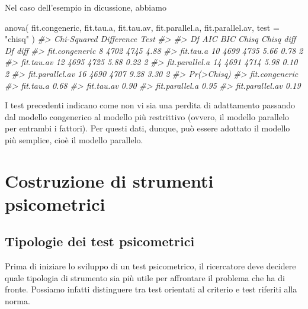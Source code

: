 \documentclass[
  11pt,
]{krantz}
\makeatletter
\newenvironment{Shaded}{\begin{snugshade}}{\end{snugshade}}
\newcommand{\AttributeTok}[1]{\textcolor[rgb]{0.61,0.61,0.61}{#1}}
\newcommand{\CommentTok}[1]{\textcolor[rgb]{0.37,0.37,0.37}{\textit{#1}}}
\newcommand{\FunctionTok}[1]{\textcolor[rgb]{0,0,0}{#1}}
\newcommand{\NormalTok}[1]{#1}
\newcommand{\StringTok}[1]{\textcolor[rgb]{0.5,0.5,0.5}{#1}}
\newenvironment{kframe}{%
\medskip{}
\setlength{\fboxsep}{.8em}
 \def\at@end@of@kframe{}%
 \ifinner\ifhmode%
  \def\at@end@of@kframe{\end{minipage}}%
  \begin{minipage}{\columnwidth}%
 \fi\fi%
 \def\FrameCommand##1{\hskip\@totalleftmargin \hskip-\fboxsep
 \colorbox{shadecolor}{##1}\hskip-\fboxsep
     \hskip-\linewidth \hskip-\@totalleftmargin \hskip\columnwidth}%
 \MakeFramed {\advance\hsize-\width
   \@totalleftmargin\z@ \linewidth\hsize
   \@setminipage}}%
 {\par\unskip\endMakeFramed%
 \at@end@of@kframe}
\renewenvironment{Shaded}{\begin{kframe}}{\end{kframe}}
\theoremstyle{definition}
\theoremstyle{definition}
\theoremstyle{definition}
\theoremstyle{definition}
\theoremstyle{remark}
\makeatother
\begin{document}
Nel caso dell'esempio in dicussione, abbiamo

\begin{Shaded}
\begin{Highlighting}[]
\FunctionTok{anova}\NormalTok{(}
\NormalTok{  fit.congeneric,}
\NormalTok{  fit.tau.a,}
\NormalTok{  fit.tau.av,}
\NormalTok{  fit.parallel.a,}
\NormalTok{  fit.parallel.av,}
  \AttributeTok{test =} \StringTok{"chisq"}
\NormalTok{)}
\CommentTok{\#\textgreater{} Chi{-}Squared Difference Test}
\CommentTok{\#\textgreater{} }
\CommentTok{\#\textgreater{}                 Df  AIC  BIC Chisq Chisq diff Df diff}
\CommentTok{\#\textgreater{} fit.congeneric   8 4702 4745  4.88                   }
\CommentTok{\#\textgreater{} fit.tau.a       10 4699 4735  5.66       0.78       2}
\CommentTok{\#\textgreater{} fit.tau.av      12 4695 4725  5.88       0.22       2}
\CommentTok{\#\textgreater{} fit.parallel.a  14 4691 4714  5.98       0.10       2}
\CommentTok{\#\textgreater{} fit.parallel.av 16 4690 4707  9.28       3.30       2}
\CommentTok{\#\textgreater{}                 Pr(\textgreater{}Chisq)}
\CommentTok{\#\textgreater{} fit.congeneric            }
\CommentTok{\#\textgreater{} fit.tau.a             0.68}
\CommentTok{\#\textgreater{} fit.tau.av            0.90}
\CommentTok{\#\textgreater{} fit.parallel.a        0.95}
\CommentTok{\#\textgreater{} fit.parallel.av       0.19}
\end{Highlighting}
\end{Shaded}

I test precedenti indicano come non vi sia una perdita di adattamento passando dal modello congenerico al modello più restrittivo (ovvero, il modello parallelo per entrambi i fattori). Per questi dati, dunque, può essere adottato il modello più semplice, cioè il modello parallelo.

\hypertarget{part-costruzione-di-strumenti-psicometrici}{%
\part{Costruzione di strumenti psicometrici}\label{part-costruzione-di-strumenti-psicometrici}}

\hypertarget{ch:problema}{%
\chapter{Tipologie dei test psicometrici}\label{ch:problema}}

Prima di iniziare lo sviluppo di un test psicometrico, il ricercatore deve decidere quale tipologia di strumento sia più utile per affrontare il problema che ha di fronte. Possiamo infatti distinguere tra test orientati al criterio e test riferiti alla norma.
\end{document}
